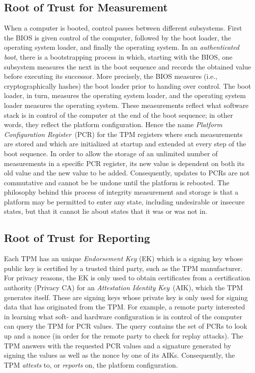 \documentclass[runningheads]{llncs}
\begin{document}
\subsection{Root of Trust for Measurement}
When a computer is booted, control passes between different subsystems. First
the BIOS is given control of the computer, followed by the boot loader, the
operating system loader, and finally the operating system. In an
\emph{authenticated boot}, there is a bootstrapping process in which, starting
with the BIOS, one subsystem measures the next in the boot sequence and records
the obtained value before executing its successor. More precisely, the BIOS
measures (i.e., cryptographically hashes) the boot loader prior to handing
over control. The boot loader, in turn, measures the operating system loader,
and the operating system loader measures the operating system.
These measurements reflect what software stack is in control of the computer
at the end of the boot sequence; in other words, they reflect the platform
configuration. Hence the name \emph{Platform Configuration Register}~(PCR)
for the TPM registers where such measurements are stored and which are
initialized at startup and extended at every step of the boot sequence. In
order to allow the storage of an unlimited number of measurements in a
specific PCR register, its new value is dependent on both its old value and
the new value to be added. Consequently, updates to PCRs are not commutative
and cannot be be undone until the platform is rebooted. The philosophy behind
this process of integrity measurement and storage is that a platform may be
permitted to enter any state, including undesirable or insecure states, but
that it cannot lie about states that it was or was not in.

\subsection{Root of Trust for Reporting}
Each TPM has an unique \emph{Endorsement Key} (EK) which is a signing key
whose public key is certified by a trusted third party, such as the TPM
manufacturer. For privacy reasons, the EK is only used to obtain certificates
from a certification authority (Privacy CA) for an \emph{Attestation Identity
Key}~(AIK), which the TPM generates itself.
These are signing keys whose private key is only used for signing data that
has originated from the TPM. For example, a remote party interested in
learning what soft- and hardware configuration is in control of the computer
can query the TPM for PCR values. The query contains the set of PCRs to look
up and a nonce (in order for the remote party to check for replay attacks).
The TPM answers with the requested PCR values and a signature generated by
signing the values as well as the nonce by one of its AIKs. Consequently,
the TPM \emph{attests} to, or \emph{reports} on, the platform configuration.
\end{document}
